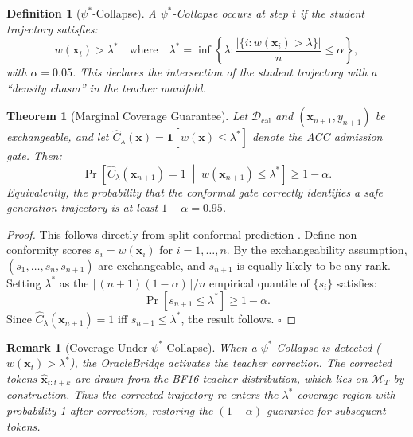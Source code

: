 \documentclass[twoside]{article}
\newtheorem{theorem}{Theorem}
\newtheorem{definition}{Definition}
\newtheorem{remark}{Remark}
\begin{document}
\begin{definition}[$\psi^*$-Collapse]
A $\psi^*$\emph{-Collapse} occurs at step $t$ if the student trajectory satisfies:
\begin{equation}
  w(\mathbf{x}_t) > \lambda^* \quad \text{where} \quad \lambda^* = \inf\!\left\{\lambda : \frac{|\{i : w(\mathbf{x}_i) > \lambda\}|}{n} \leq \alpha\right\},
\end{equation}
with $\alpha = 0.05$. This declares the intersection of the student trajectory with a ``density chasm'' in the teacher manifold.
\end{definition}

\begin{theorem}[Marginal Coverage Guarantee]
\label{thm:coverage}
Let $\mathcal{D}_\text{cal}$ and $(\mathbf{x}_{n+1}, y_{n+1})$ be exchangeable, and let $\hat{C}_\lambda(\mathbf{x}) = \mathbf{1}[w(\mathbf{x}) \leq \lambda^*]$ denote the ACC admission gate. Then:
\begin{equation}
  \Pr\!\left[\hat{C}_\lambda(\mathbf{x}_{n+1}) = 1 \;\middle|\; w(\mathbf{x}_{n+1}) \leq \lambda^*\right] \geq 1 - \alpha.
\end{equation}
Equivalently, the probability that the conformal gate correctly identifies a safe generation trajectory is at least $1 - \alpha = 0.95$.
\end{theorem}

\begin{proof}
This follows directly from split conformal prediction \cite{angelopoulos2022conformal}. Define non-conformity scores $s_i = w(\mathbf{x}_i)$ for $i = 1, \ldots, n$. By the exchangeability assumption, $(s_1, \ldots, s_n, s_{n+1})$ are exchangeable, and $s_{n+1}$ is equally likely to be any rank. Setting $\lambda^*$ as the $\lceil(n+1)(1-\alpha)\rceil / n$ empirical quantile of $\{s_i\}$ satisfies:
\begin{equation}
  \Pr[s_{n+1} \leq \lambda^*] \geq 1 - \alpha.
\end{equation}
Since $\hat{C}_\lambda(\mathbf{x}_{n+1}) = 1$ iff $s_{n+1} \leq \lambda^*$, the result follows. $\square$
\end{proof}

\begin{remark}[Coverage Under $\psi^*$-Collapse]
When a $\psi^*$-Collapse \emph{is} detected ($w(\mathbf{x}_t) > \lambda^*$), the OracleBridge activates the teacher correction. The corrected tokens $\hat{\mathbf{x}}_{t:t+k}$ are drawn from the BF16 teacher distribution, which lies on $\mathcal{M}_T$ by construction. Thus the corrected trajectory re-enters the $\lambda^*$ coverage region with probability 1 after correction, restoring the $(1 - \alpha)$ guarantee for subsequent tokens.
\end{remark}
\end{document}
